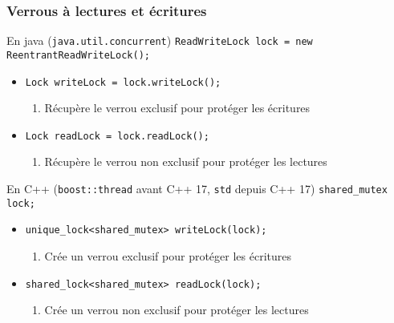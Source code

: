 \begin{frame}[fragile]
  \frametitle{Verrous à lectures et écritures}
\vfill
\begin{block}{En java (\lstinline{java.util.concurrent})}
   \lstinline{ReadWriteLock lock = new ReentrantReadWriteLock();}
   \begin{itemize}
    \item \lstinline{Lock writeLock = lock.writeLock();}
      \begin{enumerate}
      \item Récupère le verrou \alert{exclusif} pour protéger les écritures
      \end{enumerate}
    \item \lstinline{Lock readLock = lock.readLock();}
      \begin{enumerate}
      \item Récupère le verrou \alert{non exclusif} pour protéger les lectures
      \end{enumerate}
    \end{itemize}
  \end{block}

\vfill
\begin{block}{En C++ (\lstinline{boost::thread} avant C++ 17, \lstinline{std} depuis C++ 17)}
   \lstinline{shared_mutex lock;} 
    \begin{itemize}
    \item \lstinline{unique_lock<shared_mutex> writeLock(lock);}
      \begin{enumerate}
      \item Crée un verrou \alert{exclusif} pour protéger les écritures
      \end{enumerate}
    \item \lstinline{shared_lock<shared_mutex> readLock(lock);}
      \begin{enumerate}
      \item Crée un verrou \alert{non exclusif} pour protéger les lectures
      \end{enumerate}
    \end{itemize}
  \end{block}
\vfill
\end{frame}


